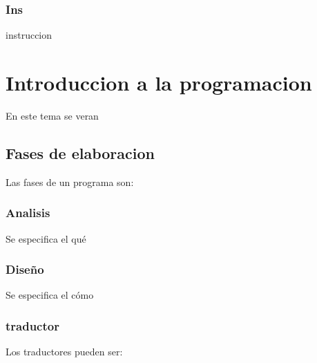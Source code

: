 \documentclass[18pt,a4paper]{article}
\begin{document}
	\subsection{Ins}
	instruccion

\chapter{Introduccion a la programacion}
En este tema se veran
	\section{Fases de elaboracion}
	Las fases de un programa son:
		\subsection{Analisis}
		Se especifica el qué
		\subsection{Diseño}
		Se especifica el cómo
		\subsection{traductor}
		Los traductores pueden ser: 
\end{document}
